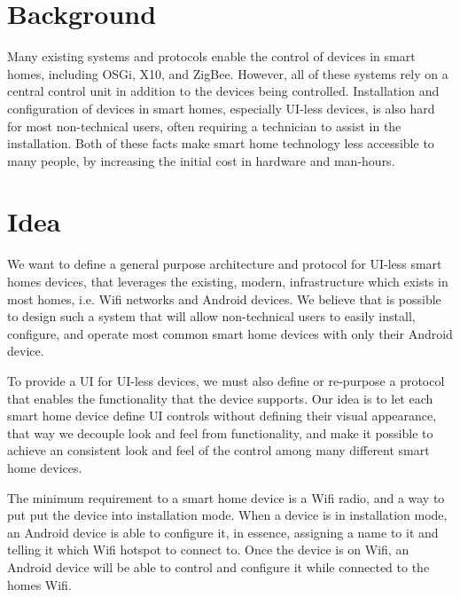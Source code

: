 \documentclass{ubicomp2011}
\begin{document}

\section{Background}
Many existing systems and protocols enable the control of devices in smart homes, including OSGi, X10, and ZigBee. However, all of these systems rely on a central control unit in addition to the devices being controlled. Installation and configuration of devices in smart homes, especially UI-less devices,  is also hard for most non-technical users, often requiring a technician to assist in the installation. Both of these facts make smart home technology less accessible to many people, by increasing the initial cost in hardware and man-hours.

\section{Idea}
We want to define a general purpose architecture and protocol for UI-less smart homes devices, that leverages the existing, modern, infrastructure which exists in most homes, i.e. Wifi networks and Android devices. We believe that is possible to design such a system that will allow non-technical users to easily install, configure, and operate most common smart home devices with only their Android device.

To provide a UI for UI-less devices, we must also define or re-purpose a protocol that enables the functionality that the device supports. Our idea is to let each smart home device define UI controls without defining their visual appearance, that way we decouple look and feel from functionality, and make it possible to achieve an consistent look and feel of the control among many different smart home devices.

The minimum requirement to a smart home device is a Wifi radio, and a way to put put the device into installation mode. When a device is in installation mode, an Android device is able to configure it, in essence, assigning a name to it and telling it which Wifi hotspot to connect to. Once the device is on Wifi, an Android device will be able to control and configure it while connected to the homes Wifi.
\end{document}
